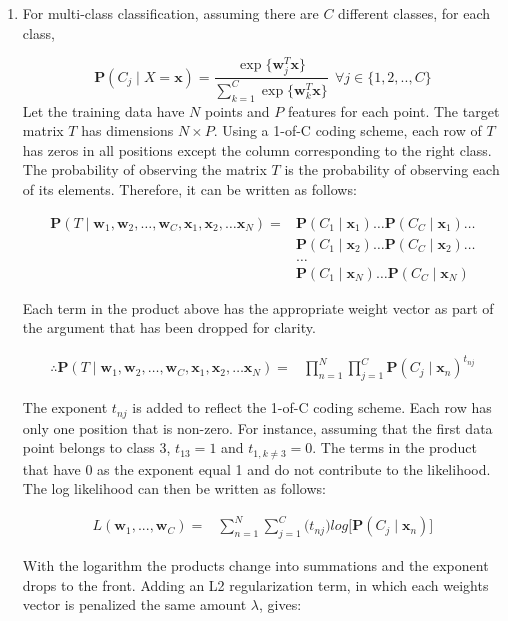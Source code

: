\documentclass[english]{article}
\newcommand{\pr}{\mathbf{P}}
\newcommand{\vw}{\mathbf{w}}
\newcommand{\vx}{\mathbf{x}}
\begin{document}
\begin{enumerate} 
\item For multi-class classification, assuming there are $C$ different classes, for each class,

$$\pr(C_j \mid X = \mathbf{x}) = \frac{\exp\{\vw_j^T\vx\}}{\sum_{k=1}^{C} \exp\{\vw_k^T\vx\}}  \ \ \forall j \in \{1, 2, .., C\}$$
Let the training data have $N$ points and $P$ features for each point. The target matrix $T$ has dimensions $N \times P$. Using a 1-of-C coding scheme, each row of $T$ has zeros in all positions except the column corresponding to the right class. 
The probability of observing the matrix $T$ is the probability of observing each of its elements. Therefore, it can be written as follows:

\begin{align*}
\pr(T \mid \vw_1, \vw_2, \dots ,\vw_C, \vx_1, \vx_2, \dots \vx_N)  {}={} & \pr(C_1 \mid \vx_1) \dots \pr(C_C \mid \vx_1) \dots \\
         & \pr(C_1 \mid \vx_2) \dots \pr(C_C \mid \vx_2) \dots \\
          & \dots \\
         & \pr(C_1 \mid \vx_N) \dots \pr(C_C \mid \vx_N)
\end{align*}

Each term in the product above has the appropriate weight vector as part of the argument that has been dropped for clarity.

\begin{align*}
\therefore \pr(T \mid \vw_1, \vw_2, \dots ,\vw_C, \vx_1, \vx_2, \dots \vx_N)  {}={} & \prod_{n = 1}^{N}\prod_{j = 1}^{C} {\pr(C_j \mid \vx_n)}^{t_{nj}}
\end{align*}

The exponent $t_{nj}$ is added to reflect the 1-of-C coding scheme. Each row has only one position that is non-zero. For instance, assuming that the first data point belongs to class 3, $t_{13} = 1$ and $t_{1, k \neq 3} = 0$. The terms in the product that have 0 as the exponent equal 1 and do not contribute to the likelihood. 
The log likelihood can then be written as follows:

\begin{align*}
L(\vw_1, ..., \vw_C)  {}={} & \sum_{n = 1}^{N}\sum_{j = 1}^{C} ({t_{nj}) log\big[{\pr(C_j \mid \vx_n)}\big]}
\end{align*}

With the logarithm the products change into summations and the exponent drops to the front.
Adding an L2 regularization term, in which each weights vector is penalized the same amount $\lambda$, gives:


\end{enumerate}
\end{document}

